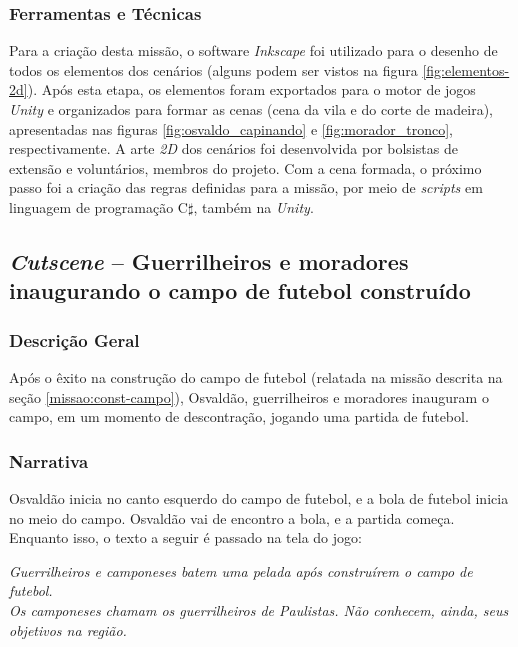 \subsubsection{Ferramentas e Técnicas}

Para a criação desta missão, o software \textit{Inkscape} foi utilizado para o desenho de todos os elementos dos cenários (alguns podem ser vistos na figura \ref{fig:elementos-2d}). Após esta etapa, os elementos foram exportados para o motor de jogos \textit{Unity} e organizados para formar as cenas (cena da vila e do corte de madeira), apresentadas nas figuras \ref{fig:osvaldo_capinando} e \ref{fig:morador_tronco}, respectivamente. A arte \textit{2D} dos cenários foi desenvolvida por bolsistas de extensão e voluntários, membros do projeto. Com a cena formada, o próximo passo foi a criação das regras definidas para a missão, por meio de \textit{scripts} em linguagem de programação C$\sharp$, também na \textit{Unity}.

\subsection{\textit{Cutscene} -- Guerrilheiros e moradores inaugurando o campo de futebol construído}

\subsubsection{Descrição Geral}

Após o êxito na construção do campo de futebol (relatada na missão descrita na seção \ref{missao:const-campo}), Osvaldão, guerrilheiros e moradores inauguram o campo, em um momento de descontração, jogando uma partida de futebol.

\subsubsection{Narrativa}

Osvaldão inicia no canto esquerdo do campo de futebol, e a bola de futebol inicia no meio do campo. Osvaldão vai de encontro a bola, e a partida começa. Enquanto isso, o texto a seguir é passado na tela do jogo:

\noindent
\textit{Guerrilheiros e camponeses batem uma pelada após construírem o campo de futebol.\\
Os camponeses chamam os guerrilheiros de Paulistas. Não conhecem, ainda, seus objetivos na região.}

